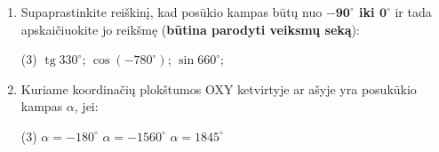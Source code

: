 \documentclass[a4paper]{article}
\DeclareMathOperator{\tg}{tg}
\begin{document}
\begin{enumerate}
      \item Supaprastinkite reiškinį, kad posūkio kampas būtų nuo
            \textbf{$\boldsymbol{-90^\circ}$
                  iki  $\boldsymbol{0^\circ}$} ir tada apskaičiuokite jo
            reikšmę
            (\textbf{būtina parodyti veiksmų seką}):
            \begin{tasks}[item-format={\normalfont},
                        after-item-skip=4mm](3)
                  \task $\tg 330^\circ$;
                  \task $\cos (-780^\circ)$;
                  \task $\sin 660^\circ$;
            \end{tasks}

      \item Kuriame koordinačių plokštumos OXY ketvirtyje ar ašyje yra
            posukūkio kampas $\alpha$, jei:

            \begin{tasks}[item-format={\normalfont},
                        after-item-skip=4mm](3)
                  \task $\alpha = -180^\circ$
                  \task $\alpha = -1560^\circ$
                  \task $\alpha = 1845^\circ$
            \end{tasks}

\end{enumerate}
\end{document}
